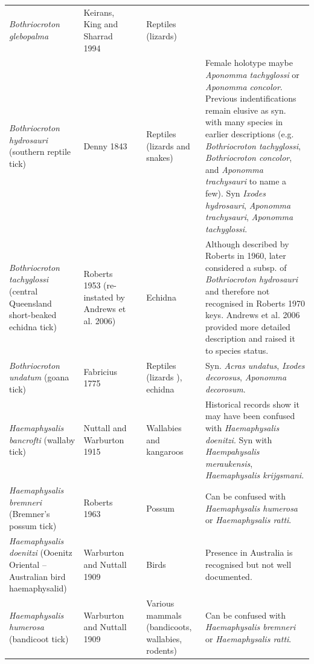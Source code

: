 \documentclass[a4paper, nobind]{templates/ociamthesis}
\begin{document}
\begin{landscape}
\begin{longtable}[t]{>{\raggedright\arraybackslash}p{4cm}>{\raggedright\arraybackslash}p{3cm}>{\raggedright\arraybackslash}p{1cm}>{\raggedright\arraybackslash}p{4cm}>{\raggedright\arraybackslash}p{6cm}}
\textit{Bothriocroton glebopalma} & Keirans, King and Sharrad 1994 & \multicolumn{1}{c}{\cellcolor[HTML]{BEBADA}{\textcolor{white}{N}}} & Reptiles (lizards) & \\
\textit{Bothriocroton hydrosauri} (southern reptile tick) & Denny 1843 & \multicolumn{1}{c}{\cellcolor[HTML]{8DD3C7}{\textcolor{white}{Y}}} & Reptiles (lizards and snakes) & Female holotype maybe \textit{Aponomma tachyglossi} or \textit{Aponomma concolor}. Previous indentifications remain elusive as syn. with many species in earlier descriptions (e.g. \textit{Bothriocroton tachyglossi}, \textit{Bothriocroton concolor}, and \textit{Aponomma trachysauri} to name a few). Syn \textit{Ixodes hydrosauri}, \textit{Aponomma trachysauri}, \textit{Aponomma tachyglossi}.\\
\textit{Bothriocroton tachyglossi} (central Queensland short-beaked echidna tick) & Roberts 1953 (re-instated by Andrews et al. 2006) & \multicolumn{1}{c}{\cellcolor[HTML]{BEBADA}{\textcolor{white}{N}}} & Echidna & Although described by Roberts in 1960, later considered a subsp. of \textit{Bothriocroton hydrosauri} and therefore not recognised in Roberts 1970 keys. Andrews et al. 2006 provided more detailed description and raised it to species status.\\
\textit{Bothriocroton undatum} (goana tick) & Fabricius 1775 & \multicolumn{1}{c}{\cellcolor[HTML]{8DD3C7}{\textcolor{white}{Y}}} & Reptiles (lizards ), echidna & Syn. \textit{Acras undatus}, \textit{Ixodes decorosus}, \textit{Aponomma decorosum}.\\
\textit{Haemaphysalis bancrofti} (wallaby tick) & Nuttall and Warburton 1915 & \multicolumn{1}{c}{\cellcolor[HTML]{8DD3C7}{\textcolor{white}{Y}}} & Wallabies and kangaroos & Historical records show it may have been confused with \textit{Haemaphysalis doenitzi}. Syn with \textit{Haempahysalis meraukensis}, \textit{Haemaphysalis krijgsmani}.\\
\textit{Haemaphysalis bremneri} (Bremner’s possum tick) & Roberts 1963 & \multicolumn{1}{c}{\cellcolor[HTML]{BEBADA}{\textcolor{white}{N}}} & Possum & Can be confused with \textit{Haemaphysalis humerosa} or \textit{Haemaphysalis ratti}.\\
\textit{Haemaphysalis doenitzi} (Ooenitz Oriental – Australian bird haemaphysalid) & Warburton and Nuttall 1909 & \multicolumn{1}{c}{\cellcolor[HTML]{8DD3C7}{\textcolor{white}{Y}}} & Birds & Presence in Australia is recognised but not well documented.\\
\textit{Haemaphysalis humerosa} (bandicoot tick) & Warburton and Nuttall 1909 & \multicolumn{1}{c}{\cellcolor[HTML]{8DD3C7}{\textcolor{white}{Y}}} & Various mammals (bandicoots, wallabies, rodents) & Can be confused with \textit{Haemaphysalis bremneri} or \textit{Haemaphysalis ratti}.\\

\end{longtable}
\end{landscape}
\end{document}
